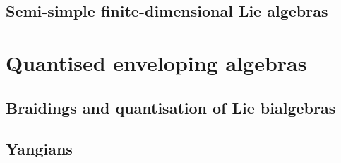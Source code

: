             \minitoc

        \begin{appendices}
            \chapter{Semi-simple finite-dimensional Lie algebras}
                \begin{abstract}
                
                \end{abstract}
                
                \minitoc
            
        \end{appendices}
    
    \part{Quantised enveloping algebras}
        \chapter{Braidings and quantisation of Lie bialgebras}
            \begin{abstract}
            
            \end{abstract}
            
            \minitoc
        
            

        \chapter{Yangians}
            \begin{abstract}
            
            \end{abstract}
            
            \minitoc
    

